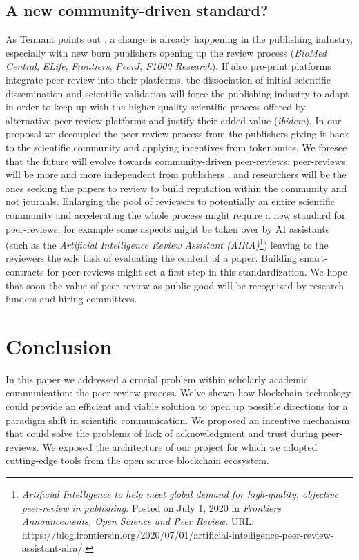 \documentclass[runningheads]{llncs}
\begin{document}
\subsection{A new community-driven standard?}
As Tennant points out \cite{Tennant2017-F1000R}, a change is already happening in the publishing industry, especially with new born publishers opening up the review process (\emph{BioMed Central}, \emph{ELife}, \emph{Frontiers}, \emph{PeerJ}, \emph{F1000 Research}). If also pre-print platforms integrate peer-review into their platforms, the dissociation of initial scientific dissemination and scientific validation will force the publishing industry to adapt in order to keep up with the higher quality scientific process offered by alternative peer-review platforms and justify their added value (\emph{ibidem}).
In our proposal we decoupled the peer-review process from the publishers giving it back to the scientific community and applying incentives from tokenomics. We foresee that the future will evolve towards community-driven peer-reviews: peer-reviews will be more and more independent from publishers \cite{DecoupJ}, and researchers will be the ones seeking the papers to review to build reputation within the community and not journals.
\newline Enlarging the pool of reviewers to potentially an entire scientific community and accelerating the whole process might require a new standard for peer-reviews: for example some aspects might be taken over by AI assistants (such as the \emph{Artificial Intelligence Review Assistant (AIRA)}\footnote[20]{\emph{Artificial Intelligence to help meet global demand for high-quality, objective peer-review in publishing.} Posted on July 1, 2020 in \emph{Frontiers Announcements, Open Science and Peer Review}. \textsc{URL:} https://blog.frontiersin.org/2020/07/01/artificial-intelligence-peer-review-assistant-aira/.}) leaving to the reviewers the sole task of evaluating the content of a paper. Building smart-contracts for peer-reviews might set a first step in this standardization. We hope that soon the value of peer review as public good will be recognized by research funders and hiring committees.

\section{Conclusion}
In this paper we addressed a crucial problem within scholarly academic communication: the peer-review process. We've shown how blockchain technology could provide an efficient and viable solution to open up possible directions for a paradigm shift in scientific communication. We proposed an incentive mechanism that could solve the problems of lack of acknowledgment and trust during peer-reviews. We exposed the architecture of our project for which we adopted cutting-edge tools from the open source blockchain ecosystem.
\end{document}
